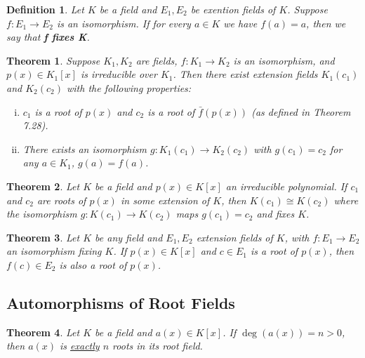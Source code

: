 \documentclass[letterpaper, 12pt]{article}
\newtheorem{defn}{Definition}
\newtheorem{thm}{Theorem}
\begin{document}
			\begin{defn}
			Let $K$ be a field and $E_{1}, E_{2}$ be exention fields of $K$.
			Suppose $f : E_{1} \to E_{2}$ is an isomorphism.
			If for every $a \in K$ we have $f(a) = a$, then we say that \textbf{f fixes K}.
			\end{defn}

			\setcounter{thm}{3}
			\begin{thm}
			Suppose $K_{1}, K_{2}$ are fields, $f : K_{1} \to K_{2}$ is an isomorphism, and $p(x) \in K_{1}[x]$ is irreducible over $K_{1}$.
			Then there exist extension fields $K_{1}(c_{1})$ and $K_{2}(c_{2})$ with the following properties:
				\begin{enumerate}[(i)]
				\item $c_{1}$ is a root of $p(x)$ and $c_{2}$ is a root of $\bar{f}(p(x))$ (as defined in Theorem 7.28).
				\item There exists an isomorphism $g : K_{1}(c_{1}) \to K_{2}(c_{2})$ with $g(c_{1}) = c_{2}$ for any $a \in K_{1}$, $g(a) = f(a)$.
				\end{enumerate}
			\end{thm}

			\setcounter{thm}{6}
			\begin{thm}
			Let $K$ be a field and $p(x) \in K[x]$ an irreducible polynomial.
			If $c_{1}$ and $c_{2}$ are roots of $p(x)$ in some extension of $K$, then $K(c_{1}) \cong K(c_{2})$ where the isomorphism $g : K(c_{1}) \to K(c_{2})$ maps $g(c_{1}) = c_{2}$ and fixes $K$.
			\end{thm}

			\setcounter{thm}{8}
			\begin{thm}
			Let $K$ be any field and $E_{1}, E_{2}$ extension fields of $K$, with $f : E_{1} \to E_{2}$ an isomorphism fixing $K$.
			If $p(x) \in K[x]$ and $c \in E_{1}$ is a root of $p(x)$, then $f(c) \in E_{2}$ is also a root of $p(x)$.
			\end{thm}

		\subsection{Automorphisms of Root Fields}
		\label{sec:automorphisms_of_root_fields}
			\begin{thm}
			Let $K$ be a field and $a(x) \in K[x]$.
			If $\deg(a(x)) = n > 0$, then $a(x)$ is \underline{exactly} $n$ roots in its root field.
			\end{thm}
\end{document}
